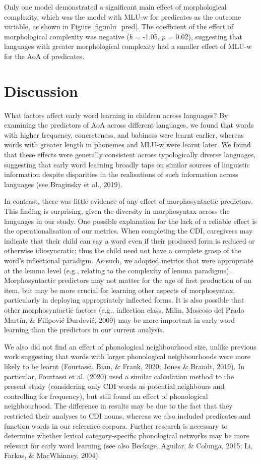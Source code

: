 \documentclass[10pt, letterpaper]{article}
\begin{document}
Only one model demonstrated a significant main effect of morphological
complexity, which was the model with MLU-w for predicates as the outcome
variable, as shown in Figure \ref{fig:mlu_pred}. The coefficient of the
effect of morphological complexity was negative (\(b\) = -1.05, \(p\) =
0.02), suggesting that languages with greater morphological complexity
had a smaller effect of MLU-w for the AoA of predicates.

\section{Discussion}\label{discussion}

What factors affect early word learning in children across languages? By
examining the predictors of AoA across different languages, we found
that words with higher frequency, concreteness, and babiness were learnt
earlier, whereas words with greater length in phonemes and MLU-w were
learnt later. We found that these effects were generally consistent
across typologically diverse languages, suggesting that early word
learning broadly taps on similar sources of linguistic information
despite disparities in the realisations of such information across
languages (see Braginsky et al., 2019).

In contrast, there was little evidence of any effect of morphosyntactic
predictors. This finding is surprising, given the diversity in
morphosyntax across the languages in our study. One possible explanation
for the lack of a reliable effect is the operationalisation of our
metrics. When completing the CDI, caregivers may indicate that their
child can say a word even if their produced form is reduced or otherwise
idiosyncratic; thus the child need not have a complete grasp of the
word's inflectional paradigm. As such, we adopted metrics that were
appropriate at the lemma level (e.g., relating to the complexity of
lemma paradigms). Morphosyntactic predictors may not matter for the age
of first production of an item, but may be more crucial for learning
other aspects of morphosyntax, particularly in deploying appropriately
inflected forms. It is also possible that other morphosyntactic factors
(e.g., inflection class, Milin, Moscoso del Prado Martín, \& Filipović
Đurđević, 2009) may be more important in early word learning than the
predictors in our current analysis.

We also did not find an effect of phonological neighbourhood size,
unlike previous work suggesting that words with larger phonological
neighbourhoods were more likely to be learnt (Fourtassi, Bian, \& Frank,
2020; Jones \& Brandt, 2019). In particular, Fourtassi et al. (2020)
used a similar calculation method to the present study (considering only
CDI words as potential neighbours and controlling for frequency), but
still found an effect of phonological neighbourhood. The difference in
results may be due to the fact that they restricted their analyses to
CDI nouns, whereas we also included predicates and function words in our
reference corpora. Further research is necessary to determine whether
lexical category-specific phonological networks may be more relevant for
early word learning (see also Beckage, Aguilar, \& Colunga, 2015; Li,
Farkas, \& MacWhinney, 2004).
\end{document}

